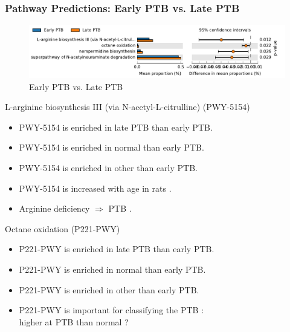 \documentclass{beamer}
\begin{document}
    \begin{frame}[allowframebreaks]
        \frametitle{Pathway Predictions: Early PTB vs. Late PTB}

        \begin{figure}
            \includegraphics[width=0.9 \linewidth]{figures/PICRUSt2/EL.pdf}
            \caption{Early PTB vs. Late PTB}
        \end{figure}

        \begin{block}{L-arginine biosynthesis III (via N-acetyl-L-citrulline) (PWY-5154)}
            \begin{itemize}
                \item PWY-5154 is enriched in late PTB than early PTB.
                \item PWY-5154 is enriched in normal than early PTB.
                \item PWY-5154 is enriched in other than early PTB.
                \item PWY-5154 is increased with age in rats \cite{PWY-5154-1}.
                \item Arginine deficiency $\Rightarrow$ PTB \cite{PWY-5154-3, PWY-5154-4, PWY-5154-2}.
            \end{itemize}
        \end{block}

        \begin{block}{Octane oxidation (P221-PWY)}
            \begin{itemize}
                \item P221-PWY is enriched in late PTB than early PTB.
                \item P221-PWY is enriched in normal than early PTB.
                \item P221-PWY is enriched in other than early PTB.
                \item P221-PWY is important for classifying the PTB \cite{P221-PWY-1}: \\
                    higher at PTB than normal ?
            \end{itemize}
        \end{block}


\end{frame}
\end{document}
